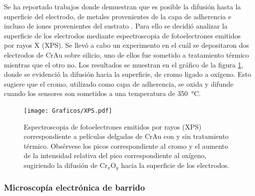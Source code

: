 {{			Se ha reportado trabajos donde demuestran que es posible la difusión hasta la superficie del electrodo, de metales provenientes de la capa de adherencia e incluso de iones provenientes del sustrato \cite{Alonso1990,Moody2003}. Para ello se decidió analizar la superficie de los electrodos mediante espectroscopia de fotoelectrones emitidos por rayos X (XPS). Se llevó a cabo un experimento en el cuál se depositaron dos electrodos de Cr\textbar Au sobre silicio, uno de ellos fue sometido a tratamiento térmico mientras que el otro no. Los resultados se muestran en el gráfico de la figura \ref{fig:XPS}, donde se evidenció la difusión hacia la superficie, de cromo ligado a oxígeno. Esto sugiere que el cromo, utilizado como capa de adherencia, se oxida y difunde cuando los sensores son sometidos a una temperatura de \SI{350}{\celsius}.

				\begin{figure}[ht!]
		 	       	\begin{center}
		 	       	\texttt{[image: Graficos/XPS.pdf]}
		        	\caption[XPS de películas delgadas de Cr\textbar Au]{Espectroscopia de fotoelectrones emitidos por rayos (XPS) correspondiente a películas delgadas de Cr\textbar Au con y sin tratamiento térmico. Obsérvese los picos correspondiente al cromo y el aumento de la intensidad relativa del pico correspondiente al oxígeno, sugiriendo la difusión de Cr$_x$O$_y$ hacia la superficie de los electrodos.}
		         	\label{fig:XPS}
		         	\end{center}
		     		\end{figure}

		\subsubsection{Microscopía electrónica de barrido}
			  		
}}
